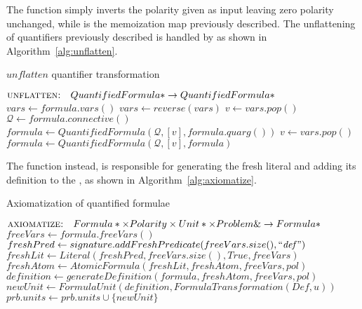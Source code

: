 The function  simply inverts the polarity given as input leaving zero polarity unchanged, while  is the memoization map previously described.
The unflattening of quantifiers previously described is handled by  as shown in Algorithm~\ref{alg:unflatten}.

\begin{algorithm}[H]
  \caption{\(unflatten\) quantifier transformation}\label{alg:unflatten}
    \begin{algorithmic}[1]
        \Statex{}  \(\textsc{unflatten:}\quad QuantifiedFormula*\to QuantifiedFormula*\)
            \State{} \(vars \gets formula.vars()\)
            \State{} \(vars \gets reverse(vars)\)
            \State{} \(v \gets vars.pop()\)
            \State{} \(\mathcal{Q} \gets formula.connective()\)
            \State{} \(formula \gets QuantifiedFormula(\mathcal{Q},[v],formula.quarg())\)
              \State{} \(v \gets vars.pop()\)
              \State{} \(formula \gets QuantifiedFormula(\mathcal{Q},[v],formula)\)
            \EndWhile{}
            \State{} 
        \EndFunction{}
    \end{algorithmic}
\end{algorithm}

The function  instead, is responsible for generating the fresh literal and adding its definition to the , as shown in Algorithm~\ref{alg:axiomatize}.

\begin{algorithm}[H]
  \caption{Axiomatization of quantified formulae}\label{alg:axiomatize}
    \begin{algorithmic}[1]
        \Statex{}  \(\textsc{axiomatize:}\quad Formula*\times Polarity\times Unit*\times Problem\&\to Formula*\)
            \State{} \(freeVars \gets formula.freeVars()\)
            \State{} \(freshPred \gets signature.addFreshPredicate(freeVars.size(), \text{``\emph{def}''})\)
            \State{} \(freshLit \gets Literal(freshPred, freeVars.size(), True, freeVars)\)
            \State{} \(freshAtom \gets AtomicFormula(freshLit,freshAtom,freeVars,pol)\)
            \State{} \(definition \gets generateDefinition(formula,freshAtom,freeVars,pol)\)
            \State{} \(newUnit \gets FormulaUnit(definition, FormulaTransformation(Def,u))\)
            \State{} \(prb.units \gets prb.units \cup \{newUnit\}\)
            \State{} 
        \EndFunction{}
    \end{algorithmic}  
\end{algorithm}

